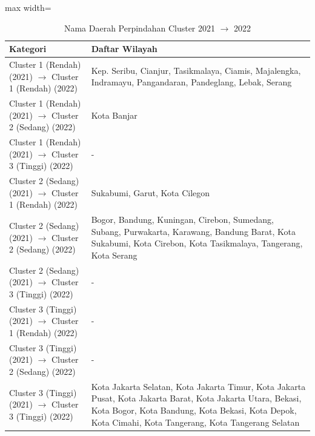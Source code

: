 \begin{table}[H]
\centering
\caption{Nama Daerah Perpindahan Cluster 2021 \(\rightarrow\) 2022} \label{tab:app1transname2021x2022}
\begin{adjustbox}{max width=\textwidth}
\begin{tabular}{|p{4cm}|p{10cm}|}
\hline
\textbf{Kategori} & \textbf{Daftar Wilayah} \\
\hline
Cluster 1 (Rendah) (2021) \(\rightarrow\) Cluster 1 (Rendah) (2022) & Kep. Seribu, Cianjur, Tasikmalaya, Ciamis, Majalengka, Indramayu, Pangandaran, Pandeglang, Lebak, Serang \\
\hline
Cluster 1 (Rendah) (2021) \(\rightarrow\) Cluster 2 (Sedang) (2022) & Kota Banjar \\
\hline
Cluster 1 (Rendah) (2021) \(\rightarrow\) Cluster 3 (Tinggi) (2022) & - \\
\hline
Cluster 2 (Sedang) (2021) \(\rightarrow\) Cluster 1 (Rendah) (2022) & Sukabumi, Garut, Kota Cilegon \\
\hline
Cluster 2 (Sedang) (2021) \(\rightarrow\) Cluster 2 (Sedang) (2022) & Bogor, Bandung, Kuningan, Cirebon, Sumedang, Subang, Purwakarta, Karawang, Bandung Barat, Kota Sukabumi, Kota Cirebon, Kota Tasikmalaya, Tangerang, Kota Serang \\
\hline
Cluster 2 (Sedang) (2021) \(\rightarrow\) Cluster 3 (Tinggi) (2022) & - \\
\hline
Cluster 3 (Tinggi) (2021) \(\rightarrow\) Cluster 1 (Rendah) (2022) & - \\
\hline
Cluster 3 (Tinggi) (2021) \(\rightarrow\) Cluster 2 (Sedang) (2022) & - \\
\hline
Cluster 3 (Tinggi) (2021) \(\rightarrow\) Cluster 3 (Tinggi) (2022) & Kota Jakarta Selatan, Kota Jakarta Timur, Kota Jakarta Pusat, Kota Jakarta Barat, Kota Jakarta Utara, Bekasi, Kota Bogor, Kota Bandung, Kota Bekasi, Kota Depok, Kota Cimahi, Kota Tangerang, Kota Tangerang Selatan \\
\hline
\end{tabular}
\end{adjustbox}
\end{table}